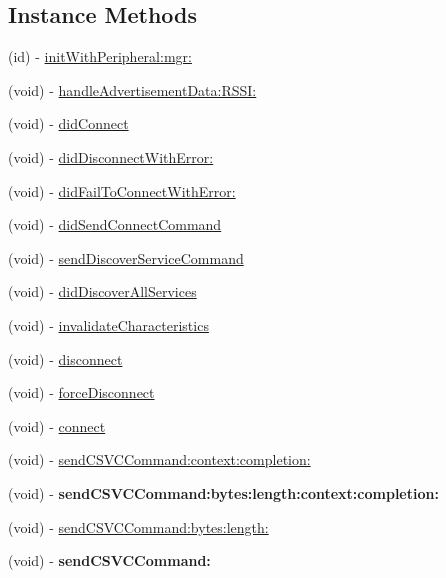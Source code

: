 \subsection*{Instance Methods}
\begin{DoxyCompactItemize}
\item 
(id) -\/ \hyperlink{interface_le_device_acbfde019a8686ad6457bdcdc3530558d}{init\+With\+Peripheral\+:mgr\+:}
\item 
(void) -\/ \hyperlink{interface_le_device_a7be1d49867ce0578a3df2b94eaa01d33}{handle\+Advertisement\+Data\+:\+R\+S\+S\+I\+:}
\item 
(void) -\/ \hyperlink{interface_le_device_abacfb6ab00c54facab6619f1899fbdba}{did\+Connect}
\item 
(void) -\/ \hyperlink{interface_le_device_a881607ee4ac1c77447575d6e319de164}{did\+Disconnect\+With\+Error\+:}
\item 
(void) -\/ \hyperlink{interface_le_device_aee8e0e10bb72f66091cde8990e85fb8d}{did\+Fail\+To\+Connect\+With\+Error\+:}
\item 
(void) -\/ \hyperlink{interface_le_device_a878dca5edcf6b11302eb6060978a0418}{did\+Send\+Connect\+Command}
\item 
(void) -\/ \hyperlink{interface_le_device_ac6617913f42e7afc6b672312a610fda7}{send\+Discover\+Service\+Command}
\item 
(void) -\/ \hyperlink{interface_le_device_acc80f805177656892279e98e46b4a3be}{did\+Discover\+All\+Services}
\item 
(void) -\/ \hyperlink{interface_le_device_a343b04a19b6faef2618395e7b0f8e37b}{invalidate\+Characteristics}
\item 
(void) -\/ \hyperlink{interface_le_device_aedf130a3cc816fc8be1815700c64d73d}{disconnect}
\item 
(void) -\/ \hyperlink{interface_le_device_a745ba6b2b15213bf55441e1f4f1bcb26}{force\+Disconnect}
\item 
(void) -\/ \hyperlink{interface_le_device_a680393dd2326c8e3f78874bb1e2bd8ce}{connect}
\item 
(void) -\/ \hyperlink{interface_le_device_ade987b54148443272bad5a226e2cba80}{send\+C\+S\+V\+C\+Command\+:context\+:completion\+:}
\item 
\hypertarget{interface_le_device_a8ef6c091aa82c3329323f60dfb673dcd}{}(void) -\/ {\bfseries send\+C\+S\+V\+C\+Command\+:bytes\+:length\+:context\+:completion\+:}\label{interface_le_device_a8ef6c091aa82c3329323f60dfb673dcd}

\item 
(void) -\/ \hyperlink{interface_le_device_a1b7e9253d93c79b976c10641cec8c165}{send\+C\+S\+V\+C\+Command\+:bytes\+:length\+:}
\item 
\hypertarget{interface_le_device_af187190eee5de2d7e35804d31dcaab18}{}(void) -\/ {\bfseries send\+C\+S\+V\+C\+Command\+:}\label{interface_le_device_af187190eee5de2d7e35804d31dcaab18}


\end{DoxyCompactItemize}
